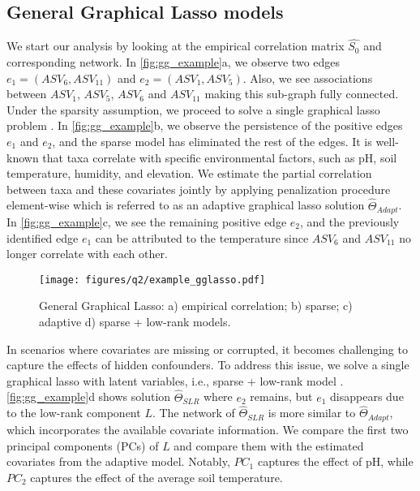 \documentclass[10pt,a4paper]{article}
\let\cite\citep
\begin{document}
\subsection*{General Graphical Lasso models}
\par We start our analysis by looking at the empirical correlation matrix $\hat{S_{0}}$ and corresponding network. In   \autoref{fig:gg_example}a, we observe two edges $e_{1} = (ASV_{6}, ASV_{11})$ and $e_{2} = (ASV_{1}, ASV_{5})$. Also, we see associations between $ASV_{1}$, $ASV_{5}$, $ASV_{6}$ and $ASV_{11}$ making this sub-graph fully connected. Under the sparsity assumption, we proceed to solve a single graphical lasso problem \cite{friedman2008sparse}. In   \autoref{fig:gg_example}b, we observe the persistence of the positive edges $e_{1}$ and $e_{2}$, and the sparse model has eliminated the rest of the edges. It is well-known that taxa correlate with specific environmental factors, such as pH, soil temperature, humidity, and elevation. We estimate the partial correlation between taxa and these covariates jointly by applying penalization procedure element-wise which is referred to as an adaptive graphical lasso solution $\hat\Theta_{Adapt}$. In   \autoref{fig:gg_example}c, we see the remaining positive edge $e_{2}$, and the previously identified edge $e_{1}$ can be attributed to the temperature since $ASV_{6}$ and $ASV_{11}$ no longer correlate with each other.

\begin{figure}[!h]
    \centering
    \texttt{[image: figures/q2/example\_gglasso.pdf]}
    \caption{General Graphical Lasso: a) empirical correlation; 
    b) sparse; c) adaptive d) sparse + low-rank models.}
    \label{fig:gg_example}
\end{figure}

\par In scenarios where covariates are missing or corrupted, it becomes challenging to capture the effects of hidden confounders. To address this issue, we solve a single graphical lasso with latent variables, i.e., sparse + low-rank model \cite{chandrasekaran2010latent}.   \autoref{fig:gg_example}d shows solution $\hat\Theta_{SLR}$ where $e_{2}$ remains, but $e_{1}$ disappears due to the low-rank component $L$. The network of $\hat\Theta_{SLR}$ is more similar to $\hat\Theta_{Adapt}$, which incorporates the available covariate information. We compare the first two principal components (PCs) of $L$ and compare them with the estimated covariates from the adaptive model. Notably, $PC_{1}$ captures the effect of pH, while $PC_{2}$ captures the effect of the average soil temperature.
\end{document}
